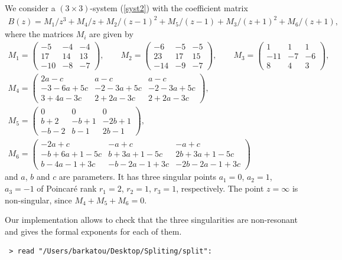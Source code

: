 \documentclass[pdftex]{sigma}
\numberwithin{equation}{section}
\begin{document}
\begin{Example} We consider a $(3\times3)$-system (\ref{syst2}) with the coefficient matrix
\begin{gather*}
B(z)= M_1/z^3+M_4/z+M_2/(z-1)^2+M_5/(z-1)+M_3/(z+1)^2+M_6/(z+1),
\end{gather*}
where the matrices $M_i$ are given by
\begin{gather*}
M_1=\left( \begin{matrix} -5&-4&-4\\ 17&14&13
\\ -10&-8&-7\end{matrix} \right), \qquad M_2= \left( \begin{matrix} -6&-5&-5\\ 23&17&15
\\ -14&-9&-7\end{matrix} \right),
\qquad M_3= \left(\begin{matrix}1&1&1\\ -11&-7&-6
\\ 8&4&3\end{matrix} \right),
\\
M_4=\left(\begin{matrix} 2 a-c&a-c&a-c\\ -3-6 a
+5 c&-2-3 a+5 c&-2-3 a+5 c\\ 3+4 a-3 c&2+2 a
-3 c&2+2 a-3 c\end{matrix}\right),
\\
M_5=\left(\begin{matrix} 0&0&0\\ b+2&-b+1&-2 b+1
\\ -b-2&b-1&2 b-1\end{matrix}\right),
\\
M_6=\left(\begin{matrix} -2 a+c&-a+c&-a+c\\ -b+6
 a+1-5 c&b+3 a+1-5 c&2 b+3 a+1-5 c\\ b-4 a-1
+3 c&-b-2 a-1+3 c&-2 b-2 a-1+3 c\end{matrix} \right)
\end{gather*}
and $a$, $b$ and $c$ are parameters. It has three singular points $a_1=0$, $a_2=1$, $a_3=-1$ of Poincar\'e rank $r_1=2$, $r_2=1$, $r_3=1$, respectively. The point $z=\infty$ is non-singular, since $M_4+M_5+M_6=0$.

Our implementation allows to check that the three singularities are non-resonant and gives the formal exponents for each of them.
\begin{verbatim} > read "/Users/barkatou/Desktop/Spliting/split":
\end{verbatim}


\end{Example}
\end{document}
